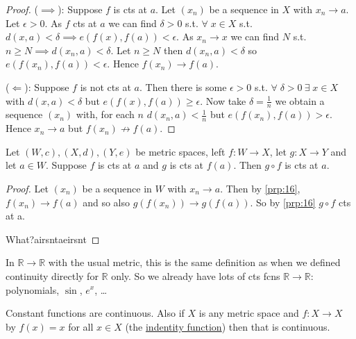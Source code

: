 \begin{proof}
    ($\implies$): Suppose $f$ is cts at $a$.
    Let $(x_n)$ be a sequence in $X$ with $x_n \to a$.
    Let $\epsilon > 0$.
    As $f$ cts at $a$ we can find $\delta > 0$ s.t. $\forall \; x \in X$ s.t. $d(x, a) < \delta \implies e(f(x), f(a)) < \epsilon$.
    As $x_n \to x$ we can find $N$ s.t. $n \geq N \implies d(x_n, a) < \delta$.
    Let $n \geq N$ then $d(x_n, a) < \delta$ so $e(f(x_n), f(a)) < \epsilon$.
    Hence $f(x_n) \to f(a)$.

    ($\Longleftarrow$): Suppose $f$ is not cts at $a$.
    Then there is some $\epsilon > 0$ s.t. $\forall \; \delta > 0 \ \exists \; x \in X$ with $d(x, a) < \delta$ but $e(f(x), f(a)) \geq \epsilon$.
    Now take $\delta = \frac{1}{n}$ we obtain a sequence $(x_n)$ with, for each $n$ $d(x_n, a) < \frac{1}{n}$ but $e(f(x_n), f(a)) > \epsilon$.
    Hence $x_n \to a$ but $f(x_n) \not\to f(a)$.
\end{proof} 

\begin{proposition} \label{prp:17}
    Let $(W, c), (X, d), (Y, e)$ be metric spaces, left $f: W \to X$, let $g: X \to Y$ and let $a \in W$.
    Suppose $f$ is cts at $a$ and $g$ is cts at $f(a)$.
    Then $g \circ f$ is cts at $a$.
\end{proposition} 

\begin{proof}
    Let $(x_n)$ be a sequence in $W$ with $x_n \to a$.
    Then by \cref{prp:16}, $f(x_n) \to f(a)$ and so also $g(f(x_n)) \to g(f(a))$.
    So by \cref{prp:16} $g \circ f$ cts at a. 

    What?airsntaeirsnt
\end{proof} 

\begin{example} \label{exm:con1}
    In $\mathbb{R} \to \mathbb{R}$ with the usual metric, this is the same definition as when we defined continuity directly for $\mathbb{R}$ only.
    So we already have lots of cts fcns $\mathbb{R} \to \mathbb{R}$: polynomials, $\sin$, $e^x$, \dots
\end{example} 

\begin{example}
    Constant functions are continuous.
    Also if $X$ is any metric space and $f: X \to X$ by $f(x) = x$ for all $x \in X$ (the \underline{indentity function}) then that is continuous.
\end{example} 

